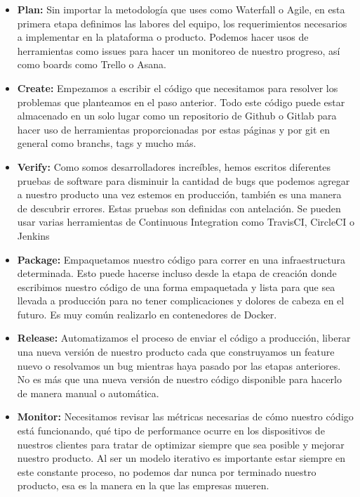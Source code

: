 \documentclass[preprint,12pt]{elsarticle}
\begin{document}
\begin{itemize}
\item \textbf{Plan:}
Sin importar la metodología que uses como Waterfall o Agile, en esta primera etapa definimos las labores del equipo, los requerimientos necesarios a implementar en la plataforma o producto.
Podemos hacer usos de herramientas como issues para hacer un monitoreo de nuestro progreso, así como boards como Trello o Asana.

\item \textbf{Create:}
Empezamos a escribir el código que necesitamos para resolver los problemas que planteamos en el paso anterior.
Todo este código puede estar almacenado en un solo lugar como un repositorio de Github o Gitlab para hacer uso de herramientas proporcionadas por estas páginas y por git en general como branchs, tags y mucho más.

\item \textbf{Verify:}
Como somos desarrolladores increíbles, hemos escritos diferentes pruebas de software para disminuir la cantidad de bugs que podemos agregar a nuestro producto una vez estemos en producción, también es una manera de descubrir errores. Estas pruebas son definidas con antelación.
Se pueden usar varias herramientas de Continuous Integration como TravisCI, CircleCI o Jenkins

\item \textbf{Package:}
Empaquetamos nuestro código para correr en una infraestructura determinada. Esto puede hacerse incluso desde la etapa de creación donde escribimos nuestro código de una forma empaquetada y lista para que sea llevada a producción para no tener complicaciones y dolores de cabeza en el futuro.
Es muy común realizarlo en contenedores de Docker.

\item \textbf{Release:}
Automatizamos el proceso de enviar el código a producción, liberar una nueva versión de nuestro producto cada que construyamos un feature nuevo o resolvamos un bug mientras haya pasado por las etapas anteriores.
No es más que una nueva versión de nuestro código disponible para hacerlo de manera manual o automática.

\item \textbf{Monitor:}
Necesitamos revisar las métricas necesarias de cómo nuestro código está funcionando, qué tipo de performance ocurre en los dispositivos de nuestros clientes para tratar de optimizar siempre que sea posible y mejorar nuestro producto.
Al ser un modelo iterativo es importante estar siempre en este constante proceso, no podemos dar nunca por terminado nuestro producto, esa es la manera en la que las empresas mueren.


\end{itemize}
\end{document}
